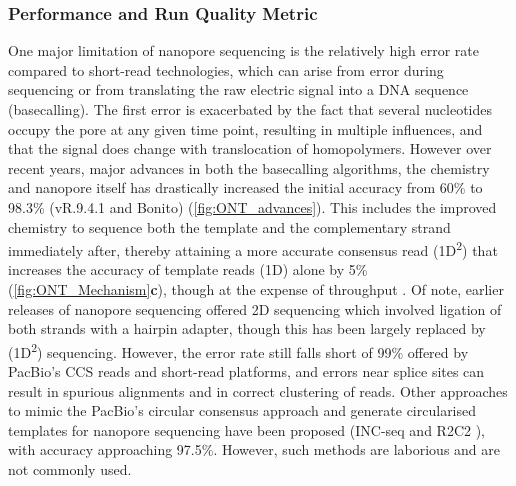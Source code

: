 \vspace{1cm}
\subsubsection{Performance and Run Quality Metric}
One major limitation of nanopore sequencing is the relatively high error rate compared to short-read technologies, which can arise from error during sequencing or from translating the raw electric signal into a DNA sequence (basecalling)\cite{Rang2018}. The first error is exacerbated by the fact that several nucleotides occupy the pore at any given time point, resulting in multiple influences, and that the signal does change with translocation of homopolymers. However over recent years, major advances in both the basecalling algorithms, the chemistry and nanopore itself has drastically increased the initial accuracy from 60\% \cite{Jain2015} to 98.3\% (vR.9.4.1 and Bonito) (\cref{fig:ONT_advances}). This includes the improved chemistry to sequence both the template and the complementary strand immediately after, thereby attaining a more accurate consensus read (1D\textsuperscript{2}) that increases the accuracy of template reads (1D) alone by 5\%\cite{Rang2018} (\cref{fig:ONT_Mechanism}\textbf{c}), though at the expense of throughput \cite{NanoporeCommunityPosts}. Of note, earlier releases of nanopore sequencing offered 2D sequencing which involved ligation of both strands with a hairpin adapter, though this has been largely replaced by (1D\textsuperscript{2}) sequencing. However, the error rate still falls short of 99\% offered by PacBio's CCS reads and short-read platforms, and errors near splice sites can result in spurious alignments and in correct clustering of reads. Other approaches to mimic the PacBio's circular consensus approach and generate circularised templates for nanopore sequencing have been proposed (INC-seq \cite{Li2016c} and R2C2 \cite{Volden2018}), with accuracy approaching 97.5\%. However, such methods are laborious and are not commonly used.  

